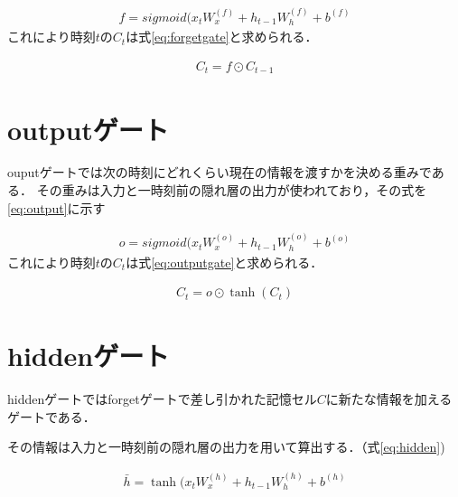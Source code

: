 \documentclass[a4j,11pt,report]{jsbook}
\begin{document}
\begin{equation}
  \label{eq:forget}
  \begin{split}
    f = sigmoid(x_{t}W_{x}^{(f)} + h_{t-1}W_{h}^{(f)} + b^{(f)}
  \end{split}
\end{equation}
これにより時刻$t$の$C_{t}$は式\ref{eq:forgetgate}と求められる．

\begin{equation}
  \label{eq:forgetgate}
  \begin{split}
    C_{t} = f \odot C_{t-1}
  \end{split}
\end{equation}


\section{outputゲート\label{sec:output}}
ouputゲートでは次の時刻にどれくらい現在の情報を渡すかを決める重みである．
その重みは入力と一時刻前の隠れ層の出力が使われており，その式を\ref{eq:output}に示す


\begin{equation}
  \label{eq:output}
  \begin{split}
    o = sigmoid(x_{t}W_{x}^{(o)} + h_{t-1}W_{h}^{(o)} + b^{(o)}
  \end{split}
\end{equation}
これにより時刻$t$の$C_{t}$は式\ref{eq:outputgate}と求められる．

\begin{equation}
  \label{eq:outputgate}
  \begin{split}
    C_{t} = o \odot \tanh(C_{t})
  \end{split}
\end{equation}

\section{hiddenゲート\label{sec:hidden}}

hiddenゲートではforgetゲートで差し引かれた記憶セル$C$に新たな情報を加えるゲートである．

その情報は入力と一時刻前の隠れ層の出力を用いて算出する．（式\ref{eq:hidden})


\begin{equation}
  \label{eq:hidden}
  \begin{split}
    \bar{h} = \tanh(x_{t}W_{x}^{(h)} + h_{t-1}W_{h}^{(h)} + b^{(h)}
  \end{split}
\end{equation}
\end{document}
